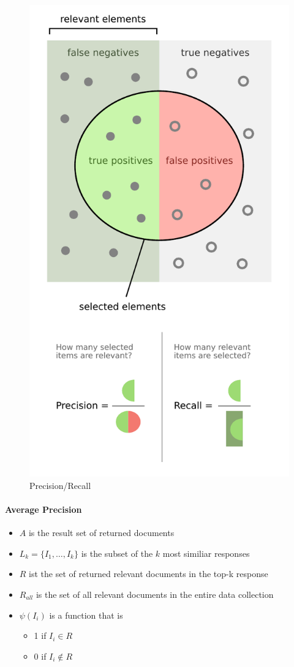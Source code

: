 \documentclass{scrartcl}
\begin{document}
\begin{figure}[ht!]
	\centering
	\includegraphics[width=0.7\linewidth]{figures/Precisionrecall.pdf}
	\caption{Precision/Recall}
	\label{fig:precision_recall}
\end{figure}


\paragraph{Average Precision}

\begin{itemize}
	\item $ A $ is the result set of returned documents
	\item $ L_k=\{I_1,\ldots,I_k\} $ is the subset of the $ k $ most similiar responses
	\item $ R $ ist the set of returned relevant documents in the top-k response
	\item $ R_{all} $ is the set of all relevant documents in the entire data collection
	\item $ \psi(I_i) $ is a function that is
	\begin{itemize}
		\item 1 if $ I_i \in R $
		\item 0 if $ I_i \not \in R $
	\end{itemize}
\end{itemize}
\end{document}
